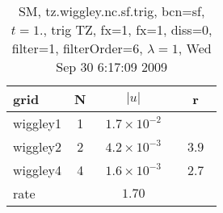 \begin{table}[hbt]\tableFont %
\begin{center}
\begin{tabular}{|l|c|c|c|} \hline 
grid  & N &  $\vert u \vert$   & r \\ \hline 
            wiggley1 &     1 & ~$1.7\times10^{ -2}$~ &            \\ \hline
            wiggley2 &     2 & ~$4.2\times10^{ -3}$~ & ~$  3.9$~  \\ \hline
            wiggley4 &     4 & ~$1.6\times10^{ -3}$~ & ~$  2.7$~  \\ \hline
    rate             &       &       $1.70$         &        \\ \hline
\end{tabular}
\caption{SM, tz.wiggley.nc.sf.trig, bcn=sf, $t=1.$, trig TZ, fx=1, fx=1, diss=0, filter=1, filterOrder=6, $\lambda=1$, Wed Sep 30  6:17:09 2009}\label{table:tz.wiggley.nc.sf.trig}
\end{center}
\end{table}
